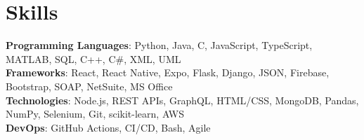 \section{Skills}
    \begin{itemize}[leftmargin=0.15in, label={}]
	\small{\item{
		\textbf{Programming Languages}{: Python, Java, C, JavaScript, TypeScript, MATLAB, SQL, C++, C\#, XML, UML} \\
		\textbf{Frameworks}{: React, React Native, Expo, Flask, Django, JSON, Firebase, Bootstrap, SOAP, NetSuite, MS Office} \\
		\textbf{Technologies}{: Node.js, REST APIs, GraphQL,  HTML/CSS, MongoDB, Pandas, NumPy, Selenium, Git, scikit-learn, AWS} \\
		\textbf{DevOps}{: GitHub Actions, CI/CD, Bash, Agile} \\
	}}
    \end{itemize}
